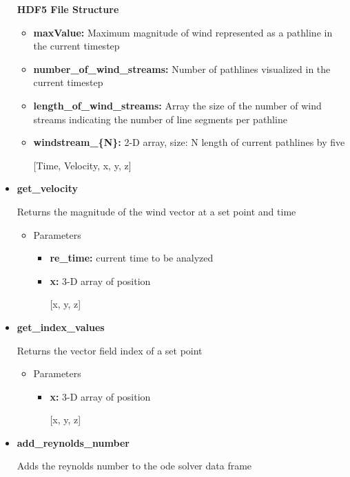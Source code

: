 \begin{itemize}
    \item[] \textbf{HDF5 File Structure}   
        \begin{itemize}
        \item\textbf{maxValue:} Maximum magnitude of wind represented as a pathline in the current timestep
        \item\textbf{number\_of\_wind\_streams:} Number of pathlines visualized in the current timestep
        \item\textbf{length\_of\_wind\_streams:} Array the size of the number of wind streams indicating the number of line segments per pathline
        \item\textbf{windstream\_\{N\}:} 2-D array, size: N {length of current pathlines}  by five
        \item[] [Time, Velocity, x, y, z]
        \end{itemize} 

    
    \item \textbf{get\_velocity}
    \item[] Returns the magnitude of the wind vector at a set point and time
            \begin{itemize}    
        \item Parameters   
            \begin{itemize}
            \item\textbf{re\_time:} current time to be analyzed 
            \item\textbf{x:} 3-D array of position 
            \item[] [x, y, z]
            \end{itemize} 
        \end{itemize}   
    
    \item \textbf{get\_index\_values}
    \item[] Returns the vector field index of a set point
            \begin{itemize}    
        \item Parameters   
            \begin{itemize} 
            \item\textbf{x:} 3-D array of position 
            \item[] [x, y, z]
            \end{itemize} 
        \end{itemize}   
    
    \item \textbf{add\_reynolds\_number}
    \item[] Adds the reynolds number  to the ode solver data frame
    

\end{itemize}
